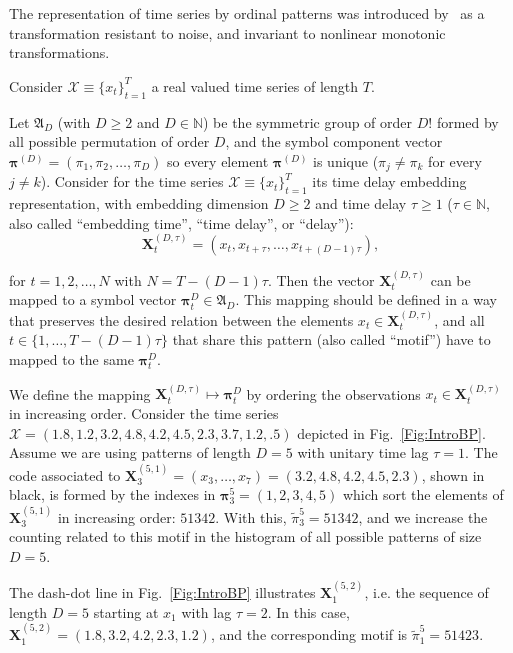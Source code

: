 \documentclass{isprs}
\renewcommand{\Bbb}{\mathbb}
\begin{document}
The representation of time series by ordinal patterns was introduced by~\cite{Bandt2002Permutation} as a transformation resistant to noise, and invariant to nonlinear monotonic transformations.

Consider ${\mathcal X} \equiv \{x_t\}_{t=1}^{T}$ a real valued time series of length $T$. 

Let ${\mathfrak A}_{D}$ (with $D \geq 2$ and $D \in {\Bbb N}$) be the symmetric group of order $D!$ formed by all 
possible permutation of order $D$, and the symbol component vector 
${\bm \pi}^{(D)} = (\pi_1, \pi_2, \dots, \pi_D)$ so every element ${\bm \pi}^{(D)}$ is unique 
($\pi_j \neq \pi_k$ for every $j \neq k$). 
Consider for the time series ${\mathcal X} \equiv \{x_t\}_{t=1}^{T}$ its time delay embedding representation,
with embedding dimension $D \geq 2$ and time delay $\tau \geq 1$ ($\tau \in {\Bbb N}$, also called ``embedding time'', ``time delay'', or ``delay''):
\begin{equation} 
\label{eq:time-delay}
{\mathbf X}^{(D,\tau)}_t =( x_t,x_{t+\tau},\dots,x_{t+(D-1)\tau} ) ,
\end{equation} 

for $t = 1,2,\dots,N$ with $N = T-(D-1) \tau$.
Then the vector ${\mathbf X}^{(D,\tau)}_t$ can be mapped to a symbol vector ${\bm \pi}_t^D \in {\mathfrak A}_{D}$. 
This mapping should be defined in a way that preserves the desired relation between the elements 
$x_t  \in {\mathbf X}^{(D,\tau)}_t$, and all $t \in \{1,\dots,T-(D-1)\tau\}$ that share this pattern (also called ``motif'') have to mapped to the same 
${\bm \pi}_t^{D}$.

We define the mapping ${\mathbf X}_t^{(D,\tau)} \mapsto {\mathbf \pi}_t^{D}$ by ordering the observations $x_t \in {\mathbf X}_t^{(D,\tau)}$ in increasing order.
Consider the time series $\mathcal X = (1.8, 1.2, 3.2, 4.8, 4.2, 4.5, 2.3, 3.7, 1.2, .5)$ depicted in Fig.~\ref{Fig:IntroBP}.
Assume we are using patterns of length $D=5$ with unitary time lag $\tau=1$.
The code associated to $\mathbf X_{3}^{(5,1)}=(x_3,\dots,x_7)=(3.2, 4.8, 4.2, 4.5, 2.3)$, shown in black, is formed by the indexes in $\bm\pi_3^{5}=(1,2,3,4,5)$ which sort the elements of $\mathbf X_{3}^{(5,1)}$ in increasing order: $51342$.
With this, $\widetilde{\pi}_3^{5} = 51342$, and we increase the counting related to this motif in the histogram of all possible patterns of size $D=5$.

The dash-dot line in Fig.~\ref{Fig:IntroBP} illustrates $\mathbf X_{1}^{(5,2)}$, i.e. the sequence of length $D=5$ starting at $x_1$ with lag $\tau=2$.
In this case, $\mathbf X_{1}^{(5,2)}= (1.8, 3.2, 4.2, 2.3, 1.2)$, and the corresponding motif is $\widetilde{\pi}_1^{5}=51423$.
\end{document}
